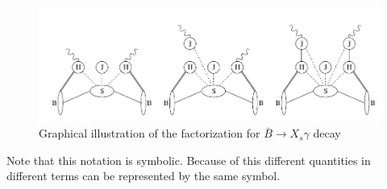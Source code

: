 \begin{figure}[H]
\centering
\includegraphics[width=15cm]{Factorization.JPG}
\caption{\label{fig:factorization} Graphical illustration of the factorization for $\bar{B}\rightarrow X_s\gamma$ decay \cite{Benzke:2010js}
}
\end{figure}
Note that this notation is symbolic. Because of this different quantities in different terms can be represented by the same symbol. 

